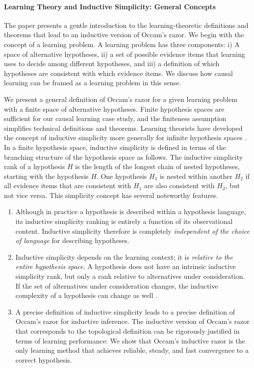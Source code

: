 \documentclass{elsarticle}%
\newcommand{\hypothesis}{H}
\begin{document}
\paragraph{Learning Theory and Inductive Simplicity: General Concepts}
The paper presents a gentle introduction to the learning-theoretic definitions and theorems that lead to an inductive version of Occam's razor. We begin with the concept of a learning problem. A learning problem has three components: i) A space of alternative hypotheses, ii) a set of possible evidence items that learning uses to decide among different hypotheses, and iii) a definition of which hypotheses are consistent with which evidence items. We discuss  how causal learning can be framed as a learning problem in this sense. 

We present a general definition of Occam's razor for a given learning problem with a finite space of alternative hypotheses. Finite hypothesis spaces are sufficient for our causal learning case study, and the finiteness assumption simplifies technical definitions and theorems. Learning theorists have developed the concept of inductive simplicity more generally for infinite hypothesis spaces \cite{luo06:_mind_chang_effic_learn}. In a finite hypothesis space, inductive simplicity is defined in terms of the branching structure of the hypothesis space as follows. The inductive simplicity rank of a hypothesis $\hypothesis$ is the length of the longest chain of nested hypotheses, starting with the hypothesis $\hypothesis$. One hypothesis $\hypothesis_{1}$ is nested within another $\hypothesis_{2}$ if all evidence items that are consistent with $\hypothesis_{1}$ are also consistent with $\hypothesis_{2}$, but not vice versa. This simplicity concept has several noteworthy features.

\begin{enumerate}
\item Although in practice a hypothesis is described within a hypothesis language, its inductive simplicity ranking is entirely a function of its observational content. Inductive simplicity therefore is completely {\em independent of the choice of language} for describing hypotheses.
\item Inductive simplicity depends on the learning context; it is {\em relative to the entire hypothesis space}. A hypothesis does not have an intrinsic inductive simplicity rank, but only a rank relative to alternatives under consideration. If the set of alternatives under consideration changes, the inductive complexity of a hypothesis can change as well \cite{schulte_discussion}.
\item A precise definition of inductive simplicity leads to a precise definition of Occam's razor for inductive inference. The inductive version of Occam's razor that corresponds to the topological definition can be rigorously justified in terms of learning performance: We show that Occam's inductive razor is the only learning method that achieves reliable, steady, and fast convergence to a correct hypothesis.
\end{enumerate}
\end{document}
